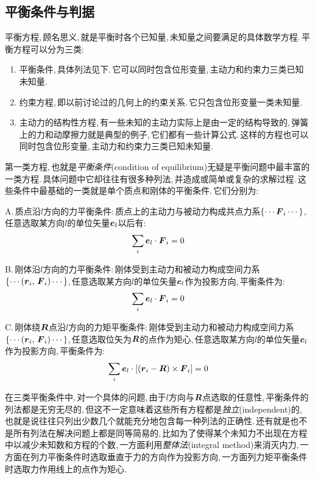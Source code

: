 \subsection{平衡条件与判据}

平衡方程,\,顾名思义,\,就是平衡时各个已知量,\,未知量之间要满足的具体数学方程.\,平衡方程可以分为三类:
\begin{enumerate}
	\item 平衡条件,\,具体列法见下.\,它可以同时包含位形变量,\,主动力和约束力三类已知未知量.
	\item 约束方程,\,即以前讨论过的几何上的约束关系.\,它只包含位形变量一类未知量.
	\item 主动力的结构性方程,\,有一些未知的主动力实际上是由一定的结构导致的,\,弹簧上的力和动摩擦力就是典型的例子,\,它们都有一些计算公式.\,这样的方程也可以同时包含位形变量,\,主动力和约束力三类已知未知量.
\end{enumerate}

第一类方程,\,也就是\emph{平衡条件}(condition of equilibrium)无疑是平衡问题中最丰富的一类方程.\,具体问题中它却往往有很多种列法,\,并造成或简单或复杂的求解过程.\,这些条件中最基础的一类就是单个质点和刚体的平衡条件.\,它们分别为:
\vspace{1cm}

A.\,质点沿$l$方向的力平衡条件:\,质点上的主动力与被动力构成共点力系$\{\cdots\boldsymbol{F}_i\cdots\}$,\,任意选取某方向$l$的单位矢量$\boldsymbol{e}_l$以后有:
\[\sum_i\boldsymbol{e}_l\cdot\boldsymbol{F}_i=0\]

B.\,刚体沿$l$方向的力平衡条件:\,刚体受到主动力和被动力构成空间力系$\{\cdots(\boldsymbol{r}_i,\,\boldsymbol{F}_i)\cdots\}$,\,任意选取某方向$l$的单位矢量$\boldsymbol{e}_l$作为投影方向,\,平衡条件为:
\[\sum_i\boldsymbol{e}_l\cdot\boldsymbol{F}_i=0\]

C.\,刚体绕$\boldsymbol{R}$点沿$l$方向的力矩平衡条件:\,刚体受到主动力和被动力构成空间力系$\{\cdots(\boldsymbol{r}_i,\,\boldsymbol{F}_i)\cdots\}$,\,任意选取位矢为$\boldsymbol{R}$的点作为矩心,\,任意选取某方向$l$的单位矢量$\boldsymbol{e}_l$作为投影方向,\,平衡条件为:
\[\sum_i\boldsymbol{e}_l\cdot[(\boldsymbol{r}_i-\boldsymbol{R})\times\boldsymbol{F}_i]=0\]

\vspace{1cm}
在三类平衡条件中,\,对一个具体的问题,\,由于$l$方向与$\boldsymbol{R}$点选取的任意性,\,平衡条件的列法都是无穷无尽的,\,但这不一定意味着这些所有方程都是\emph{独立}(independent)的,\,也就是说往往只列出少数几个就能充分地包含每一种列法的正确性.\,还有就是也不是所有列法在解决问题上都是同等简易的,\,比如为了使得某个未知力不出现在方程中以减少未知数和方程的个数,\,一方面利用\emph{整体法}(integral method)来消灭内力,\,一方面在列力平衡条件时选取垂直于力的方向作为投影方向,\,一方面列力矩平衡条件时选取力作用线上的点作为矩心.

